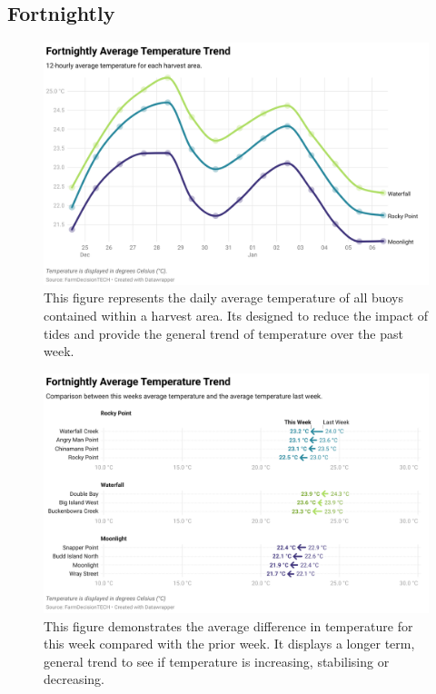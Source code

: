 \documentclass[10pt]{article}
\begin{document}
\subsection{Fortnightly}

\begin{figure}[H]
\centering
\includegraphics[width=\textwidth]{fortnightly-temperature-chart.png}
\caption[Average Fortnightly Temperature Chart]{This figure represents the daily average temperature of all buoys contained within a harvest area. Its designed to reduce the impact of tides and provide the general trend of temperature over the past week.}
\end{figure}

\begin{figure}[H]
\centering
\includegraphics[width=\textwidth]{fortnightly-temperature.png}
\caption[Average Fortnightly Temperature Difference]{This figure demonstrates the average difference in temperature for this week compared with the prior week. It displays a longer term, general trend to see if temperature is increasing, stabilising or decreasing.}
\end{figure}
\end{document}
